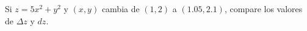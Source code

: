 \item Si $z = 5x^2 + y^2$ y $(x, y)$ cambia de $(1, 2)$ a $(1.05, 2.1)$, compare los valores de $\Delta z$ y $dz$.
